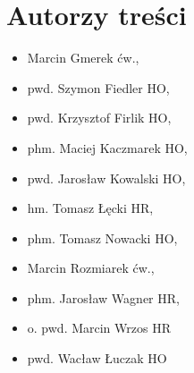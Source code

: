 \chapter{Autorzy treści}
\begin{multicols}{2}
\begin{itemize}
\item Marcin Gmerek ćw., 
\item pwd. Szymon Fiedler HO, 
\item pwd. Krzysztof Firlik HO, 
\item phm. Maciej Kaczmarek HO, 
\item pwd. Jarosław Kowalski HO, 
\item hm. Tomasz Łęcki HR, 
\item phm. Tomasz Nowacki HO, 
\item Marcin Rozmiarek ćw., 
\item phm. Jarosław Wagner HR, 
\item o. pwd. Marcin Wrzos HR 
\item pwd. Wacław Łuczak HO
\end{itemize}
\end{multicols}
